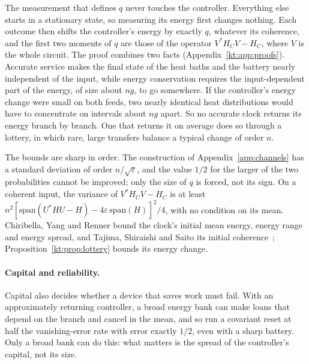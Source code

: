 The measurement that defines $q$ never touches the controller. Everything else starts in a stationary state, so measuring its energy first changes nothing. Each outcome then shifts the controller's energy by exactly $q$, whatever its coherence, and the first two moments of $q$ are those of the operator $V^*H_CV-H_C$, where $V$ is the whole circuit. The proof combines two facts (Appendix~\ref{kt:app:proofs}). Accurate service makes the final state of the heat baths and the battery nearly independent of the input, while energy conservation requires the input-dependent part of the energy, of size about $ng$, to go somewhere. If the controller's energy change were small on both feeds, two nearly identical heat distributions would have to concentrate on intervals about $ng$ apart. So no accurate clock returns its energy branch by branch. One that returns it on average does so through a lottery, in which rare, large transfers balance a typical change of order $n$.

The bounds are sharp in order. The construction of Appendix~\ref{app:channels} has a standard deviation of order $n/\sqrt\varepsilon$, and the value $1/2$ for the larger of the two probabilities cannot be improved; only the size of $q$ is forced, not its sign. On a coherent input, the variance of $V^*H_CV-H_C$ is at least $n^2[\mathrm{span}(U^*HU-H)-4\varepsilon\,\mathrm{span}(H)]^2/4$, with no condition on its mean. Chiribella, Yang and Renner bound the clock's initial mean energy, energy range and energy spread, and Tajima, Shiraishi and Saito its initial coherence~\cite{ChiribellaYangRenner21,TSS20}; Proposition~\ref{kt:prop:lottery} bounds its energy change.

\paragraph{Capital and reliability.} Capital also decides whether a device that saves work must fail. With an approximately returning controller, a broad energy bank can make loans that depend on the branch and cancel in the mean, and so run a covariant reset at half the vanishing-error rate with error exactly $1/2$, even with a sharp battery. Only a broad bank can do this: what matters is the spread of the controller's capital, not its size.

